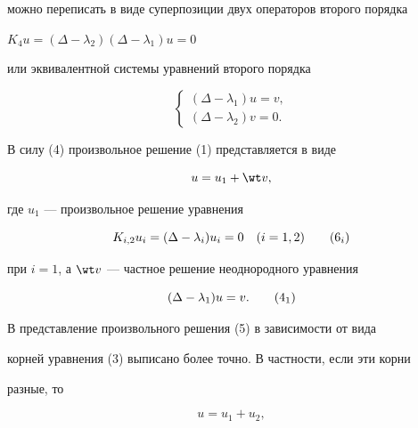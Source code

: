 можно переписать в виде суперпозиции двух операторов второго порядка 


$K_4u=(\Delta-\lambda_2)(\Delta-\lambda_1)u=0$ 


или эквивалентной системы уравнений второго порядка 


\begin{equation} 


\begin{cases} 


(\Delta-\lambda_1)u=v, \\ 


(\Delta-\lambda_2)v=0. 


\end{cases} 


\end{equation} 


В силу (4) произвольное решение (1) представляется в виде 


\begin{equation} 


u=u_1+\wt v, 


\end{equation} 


где $u_1$ --- произвольное решение уравнения 


\begin{equation} 


K_{i,2}u_i=(\Delta-\lambda_i)u_i=0\quad (i=1,2) \tag{6${}_i$} 


\end{equation} 


при $i=1$, а $\wt v$ --- частное решение неоднородного уравнения 


\begin{equation} 


(\Delta-\lambda_1)u=v.\tag{4${}_1$} 


\end{equation} 


 


В \cite{5} представление произвольного решения (5) в зависимости от вида 


корней уравнения (3) выписано более точно. В частности, если эти корни 


разные, то 


\begin{equation} 


u=u_1+u_2,\tag{5$'$} 


\end{equation} 


